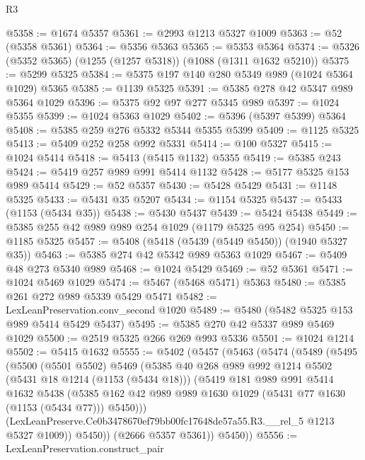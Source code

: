 \begin{lexlean}{R3}
\begin{coremodule}
@5358 := @1674 @5357
@5361 := @2993 @1213 @5327 @1009
@5363 := @52 (@5358 @5361)
@5364 := @5356 @5363
@5365 := @5353 @5364
@5374 := @5326 (@5352 @5365) (@1255 (@1257 @5318)) (@1088 (@1311 @1632 @5210))
@5375 := @5299 @5325
@5384 := @5375 @197 @140 @280 @5349 @989 (@1024 @5364 @1029) @5365
@5385 := @1139 @5325
@5391 := @5385 @278 @42 @5347 @989 @5364 @1029
@5396 := @5375 @92 @97 @277 @5345 @989
@5397 := @1024 @5355
@5399 := @1024 @5363 @1029
@5402 := @5396 (@5397 @5399) @5364
@5408 := @5385 @259 @276 @5332 @5344 @5355 @5399
@5409 := @1125 @5325
@5413 := @5409 @252 @258 @992 @5331
@5414 := @100 @5327
@5415 := @1024 @5414
@5418 := @5413 (@5415 @1132) @5355
@5419 := @5385 @243
@5424 := @5419 @257 @989 @991 @5414 @1132
@5428 := @5177 @5325 @153 @989 @5414
@5429 := @52 @5357
@5430 := @5428 @5429
@5431 := @1148 @5325
@5433 := @5431 @35 @5207
@5434 := @1154 @5325
@5437 := @5433 (@1153 (@5434 @35))
@5438 := @5430 @5437
@5439 := @5424 @5438
@5449 := @5385 @255 @42 @989 @989 @254 @1029 (@1179 @5325 @95 @254)
@5450 := @1185 @5325
@5457 := @5408 (@5418 (@5439 (@5449 @5450)) (@1940 @5327 @35))
@5463 := @5385 @274 @42 @5342 @989 @5363 @1029
@5467 := @5409 @48 @273 @5340 @989
@5468 := @1024 @5429
@5469 := @52 @5361
@5471 := @1024 @5469 @1029
@5474 := @5467 (@5468 @5471) @5363
@5480 := @5385 @261 @272 @989 @5339 @5429 @5471
@5482 := LexLeanPreservation.conv_second @1020
@5489 := @5480 (@5482 @5325 @153 @989 @5414 @5429 @5437)
@5495 := @5385 @270 @42 @5337 @989 @5469 @1029
@5500 := @2519 @5325 @266 @269 @993 @5336
@5501 := @1024 @1214
@5502 := @5415 @1632
@5555 := @5402
    (@5457
      (@5463
        (@5474
          (@5489
            (@5495
              (@5500
                (@5501 @5502)
                @5469
                (@5385
                  @40
                  @268
                  @989
                  @992
                  @1214
                  @5502
                  (@5431 @18 @1214 (@1153 (@5434 @18)))
                  (@5419
                    @181
                    @989
                    @991
                    @5414
                    @1632
                    @5438
                    (@5385
                      @162
                      @42
                      @989
                      @989
                      @1630
                      @1029
                      (@5431 @77 @1630 (@1153 (@5434 @77)))
                      @5450)))
                (LexLeanPreserve.Ce0b3478670ef79bb00fc17648de57a55.R3.__rel_5 @1213 @5327 @1009))
              @5450))
          (@2666 @5357 @5361))
        @5450))
@5556 := LexLeanPreservation.construct_pair

\end{coremodule}
\end{lexlean}
